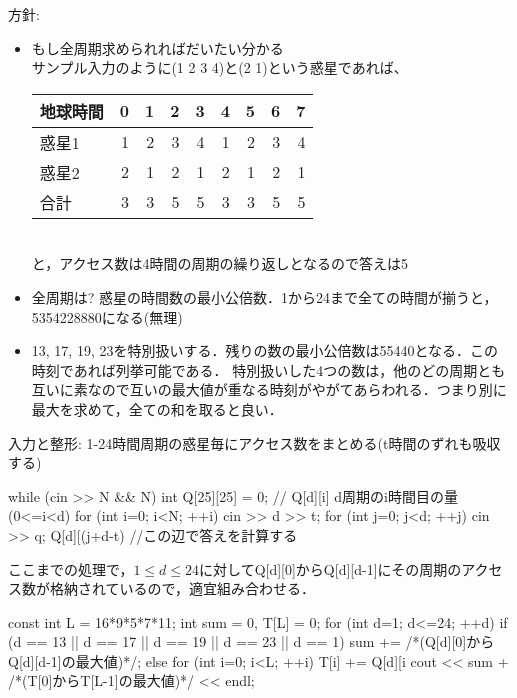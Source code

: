\begin{versionbeta}
方針:
\begin{itemize}
\setlength{\itemsep}{0pt}
\item もし全周期求められればだいたい分かる\\
サンプル入力のように(1 2 3 4)と(2 1)という惑星であれば、\\
\begin{tabular}{l|rrrrrrrr}
地球時間& 0 & 1 & 2 & 3 & 4 & 5 & 6 &7\\\hline
  惑星1 & 1 & 2 & 3 & 4 & 1 & 2 & 3 & 4\\
  惑星2 & 2 & 1 & 2 & 1 & 2 & 1 & 2 & 1\\\hline
  合計  & 3 & 3 & 5 & 5 & 3 & 3 & 5 & 5
\end{tabular}\\
と，アクセス数は4時間の周期の繰り返しとなるので答えは5
\item 全周期は? 惑星の時間数の最小公倍数．1から24まで全ての時間が揃うと，5354228880になる(無理)
\item 13, 17, 19, 23を特別扱いする．残りの数の最小公倍数は55440となる．この時刻であれば列挙可能である．
特別扱いした4つの数は，他のどの周期とも互いに素なので互いの最大値が重なる時刻がやがてあらわれる．つまり別に最大を求めて，全ての和を取ると良い．
\end{itemize}

入力と整形: 1-24時間周期の惑星毎にアクセス数をまとめる(t時間のずれも吸収する)\\
\begin{cbox}
    while (cin >> N && N) {
        int Q[25][25] = {{0}}; // Q[d][i] d周期のi時間目の量 (0<=i<d) 
        for (int i=0; i<N; ++i) {
            cin >> d >> t;
            for (int j=0; j<d; ++j) { 
                cin >> q;
                Q[d][(j+d-t)
            }
        }
        //この辺で答えを計算する
    }
\end{cbox}


ここまでの処理で，$1\le d \le 24$に対してQ[d][0]からQ[d][d-1]にその周期のアクセス数が格納されているので，適宜組み合わせる．

\begin{cbox}
const int L = 16*9*5*7*11;
        int sum = 0, T[L] = {0};
        for (int d=1; d<=24; ++d) {
            if (d == 13 || d == 17 || d == 19 || d == 23 || d == 1)
                sum += /*(Q[d][0]からQ[d][d-1]の最大値)*/;
            else
                for (int i=0; i<L; ++i) T[i] += Q[d][i
        }
        cout << sum + /*(T[0]からT[L-1]の最大値)*/ << endl;
\end{cbox}


\end{versionbeta}
